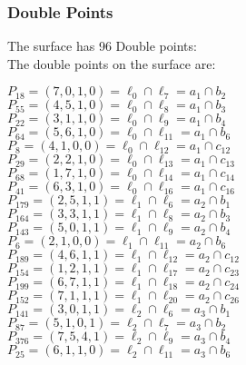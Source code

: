 \documentclass{article}
\begin{document}
{\subsubsection*{Double Points}
The surface has 96 Double points:\\
The double points on the surface are:\\
\begin{multicols}{2}
\noindent
$P_{18} = ( 7, 0, 1, 0 ) = \ell_{0} \cap \ell_{7}  = a_{1} \cap b_{2}$\\
$P_{55} = ( 4, 5, 1, 0 ) = \ell_{0} \cap \ell_{8}  = a_{1} \cap b_{3}$\\
$P_{22} = ( 3, 1, 1, 0 ) = \ell_{0} \cap \ell_{9}  = a_{1} \cap b_{4}$\\
$P_{64} = ( 5, 6, 1, 0 ) = \ell_{0} \cap \ell_{11}  = a_{1} \cap b_{6}$\\
$P_{8} = ( 4, 1, 0, 0 ) = \ell_{0} \cap \ell_{12}  = a_{1} \cap c_{12}$\\
$P_{29} = ( 2, 2, 1, 0 ) = \ell_{0} \cap \ell_{13}  = a_{1} \cap c_{13}$\\
$P_{68} = ( 1, 7, 1, 0 ) = \ell_{0} \cap \ell_{14}  = a_{1} \cap c_{14}$\\
$P_{41} = ( 6, 3, 1, 0 ) = \ell_{0} \cap \ell_{16}  = a_{1} \cap c_{16}$\\
$P_{179} = ( 2, 5, 1, 1 ) = \ell_{1} \cap \ell_{6}  = a_{2} \cap b_{1}$\\
$P_{164} = ( 3, 3, 1, 1 ) = \ell_{1} \cap \ell_{8}  = a_{2} \cap b_{3}$\\
$P_{143} = ( 5, 0, 1, 1 ) = \ell_{1} \cap \ell_{9}  = a_{2} \cap b_{4}$\\
$P_{6} = ( 2, 1, 0, 0 ) = \ell_{1} \cap \ell_{11}  = a_{2} \cap b_{6}$\\
$P_{189} = ( 4, 6, 1, 1 ) = \ell_{1} \cap \ell_{12}  = a_{2} \cap c_{12}$\\
$P_{154} = ( 1, 2, 1, 1 ) = \ell_{1} \cap \ell_{17}  = a_{2} \cap c_{23}$\\
$P_{199} = ( 6, 7, 1, 1 ) = \ell_{1} \cap \ell_{18}  = a_{2} \cap c_{24}$\\
$P_{152} = ( 7, 1, 1, 1 ) = \ell_{1} \cap \ell_{20}  = a_{2} \cap c_{26}$\\
$P_{141} = ( 3, 0, 1, 1 ) = \ell_{2} \cap \ell_{6}  = a_{3} \cap b_{1}$\\
$P_{87} = ( 5, 1, 0, 1 ) = \ell_{2} \cap \ell_{7}  = a_{3} \cap b_{2}$\\
$P_{376} = ( 7, 5, 4, 1 ) = \ell_{2} \cap \ell_{9}  = a_{3} \cap b_{4}$\\
$P_{25} = ( 6, 1, 1, 0 ) = \ell_{2} \cap \ell_{11}  = a_{3} \cap b_{6}$\\

\end{multicols}}
\end{document}
